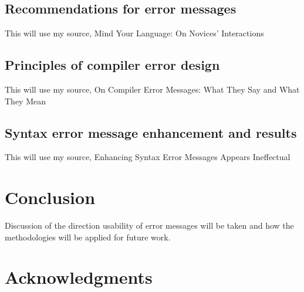 \documentclass{sig-alternate}
\begin{document}
\subsection{Recommendations for error messages}\label{subsec:error message rubric}
This will use my source, Mind Your Language: On Novices' Interactions 

\subsection{Principles of compiler error design}\label{subsec:compiler error design}
This will use my source, On Compiler Error Messages: What They Say and What They Mean

\subsection{Syntax error message enhancement and results}\label{subsec:syntax enhancement}
This will use my source, Enhancing Syntax Error Messages Appears Ineffectual


\section{Conclusion}\label{sec:concl}
Discussion of the direction usability of error messages will be taken and how the methodologies will be applied for future work.



\section{Acknowledgments}\label{sec:ackn}




  

~\cite{Denny:2014:ESE:2591708.2591748}
~\cite{Hartmann:2010:OPS:1753326.1753478}
~\cite{Isa:1983:MOE:800045.801583}
~\cite{Kummerfeld:2003:NBF:858403.858416}
~\cite{Marceau:2011:MEE:1953163.1953308}
~\cite{Marceau:2011:MYL:2048237.2048241}
~\cite{Murphy:2008:BTD:1352135.1352193}
~\cite{Traver:2010}
\end{document}
